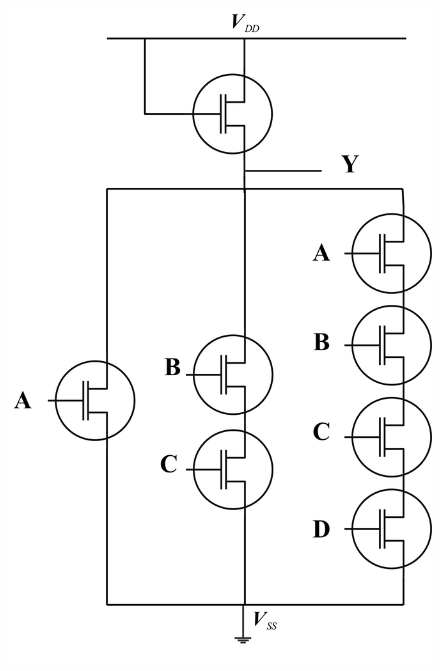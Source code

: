 \documentclass[a4paper,12pt]{article}
\begin{document}
\begin{figure}[H]
	\centering
	\includegraphics[width=0.7\linewidth]{Images/open}
	\caption{}
	\label{fig:open}
\end{figure}
	
\end{document}
